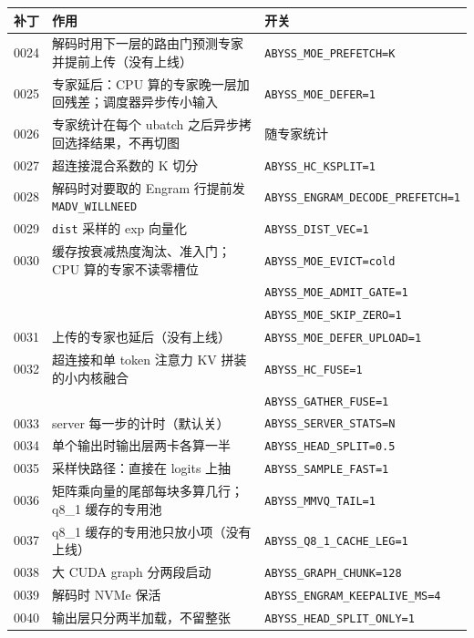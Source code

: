 \documentclass[11pt,a4paper]{article}
\newcommand{\code}[1]{\texttt{#1}}
\begin{document}
\begin{table}[h]
  \centering
  \small
  \begin{tabularx}{\textwidth}{@{}l X l@{}}
    \toprule
    补丁 & 作用 & 开关 \\
    \midrule
    0024 & 解码时用下一层的路由门预测专家并提前上传（没有上线） & \code{ABYSS\_MOE\_PREFETCH=K} \\
    0025 & 专家延后：CPU 算的专家晚一层加回残差；调度器异步传小输入 & \code{ABYSS\_MOE\_DEFER=1} \\
    0026 & 专家统计在每个 ubatch 之后异步拷回选择结果，不再切图 & 随专家统计 \\
    0027 & 超连接混合系数的 K 切分 & \code{ABYSS\_HC\_KSPLIT=1} \\
    0028 & 解码时对要取的 Engram 行提前发 \code{MADV\_WILLNEED} & \code{ABYSS\_ENGRAM\_DECODE\_PREFETCH=1} \\
    0029 & \code{dist} 采样的 exp 向量化 & \code{ABYSS\_DIST\_VEC=1} \\
    0030 & 缓存按衰减热度淘汰、准入门；CPU 算的专家不读零槽位 & \code{ABYSS\_MOE\_EVICT=cold} \\
         & & \code{ABYSS\_MOE\_ADMIT\_GATE=1} \\
         & & \code{ABYSS\_MOE\_SKIP\_ZERO=1} \\
    0031 & 上传的专家也延后（没有上线） & \code{ABYSS\_MOE\_DEFER\_UPLOAD=1} \\
    0032 & 超连接和单 token 注意力 KV 拼装的小内核融合 & \code{ABYSS\_HC\_FUSE=1} \\
         & & \code{ABYSS\_GATHER\_FUSE=1} \\
    0033 & server 每一步的计时（默认关） & \code{ABYSS\_SERVER\_STATS=N} \\
    0034 & 单个输出时输出层两卡各算一半 & \code{ABYSS\_HEAD\_SPLIT=0.5} \\
    0035 & 采样快路径：直接在 logits 上抽 & \code{ABYSS\_SAMPLE\_FAST=1} \\
    0036 & 矩阵乘向量的尾部每块多算几行；q8\_1 缓存的专用池 & \code{ABYSS\_MMVQ\_TAIL=1} \\
    0037 & q8\_1 缓存的专用池只放小项（没有上线） & \code{ABYSS\_Q8\_1\_CACHE\_LEG=1} \\
    0038 & 大 CUDA graph 分两段启动 & \code{ABYSS\_GRAPH\_CHUNK=128} \\
    0039 & 解码时 NVMe 保活 & \code{ABYSS\_ENGRAM\_KEEPALIVE\_MS=4} \\
    0040 & 输出层只分两半加载，不留整张 & \code{ABYSS\_HEAD\_SPLIT\_ONLY=1} \\

\end{tabularx}
\end{table}
\end{document}
